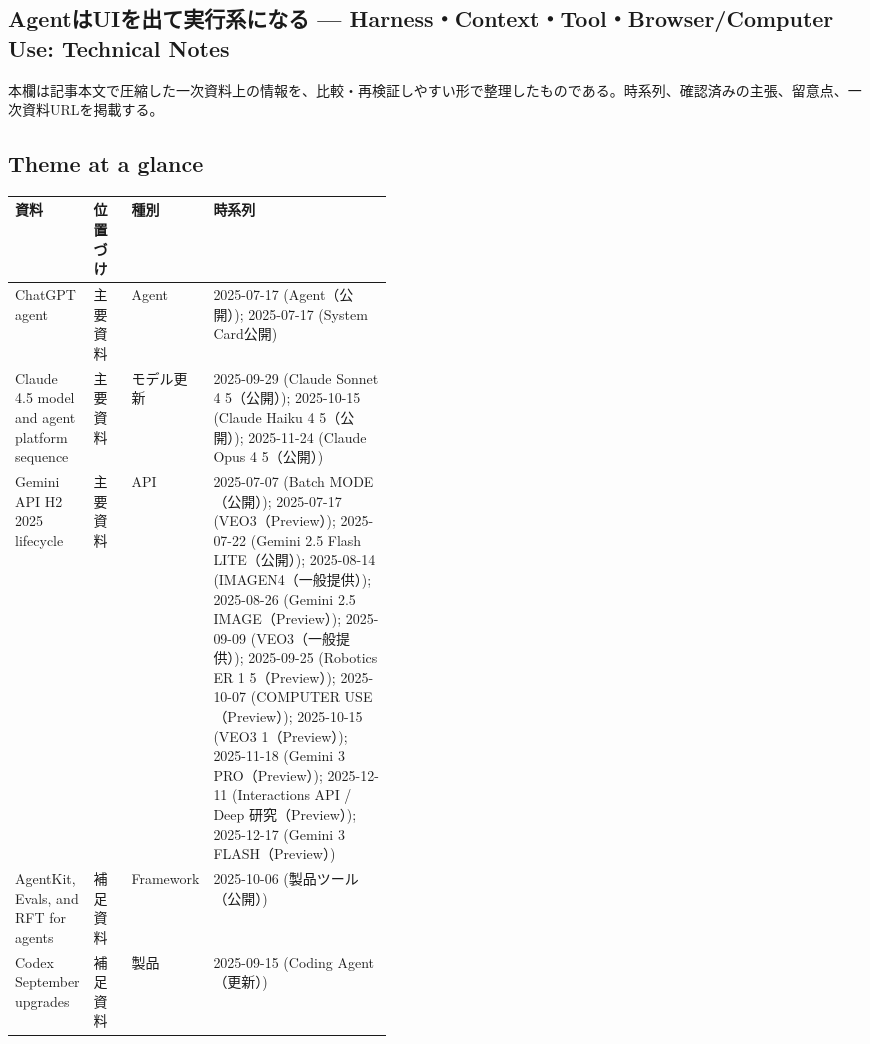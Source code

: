 \subsection*{AgentはUIを出て実行系になる — Harness・Context・Tool・Browser/Computer Use: Technical Notes}
本欄は記事本文で圧縮した一次資料上の情報を、比較・再検証しやすい形で整理したものである。時系列、確認済みの主張、留意点、一次資料URLを掲載する。
\medskip
\subsection*{Theme at a glance}
\begin{center}
\footnotesize
\begin{tabularx}{\linewidth}{@{}p{0.20\linewidth}p{0.10\linewidth}p{0.14\linewidth}X@{}}
\toprule
資料 & 位置づけ & 種別 & 時系列 \\
\midrule
ChatGPT agent & 主要資料 & Agent & 2025-07-17 (Agent（公開）); 2025-07-17 (System Card公開)    \\
Claude 4.5 model and agent platform sequence & 主要資料 & モデル更新 & 2025-09-29 (Claude Sonnet 4 5（公開）); 2025-10-15 (Claude Haiku 4 5（公開）); 2025-11-24 (Claude Opus 4 5（公開）)    \\
Gemini API H2 2025 lifecycle & 主要資料 & API & 2025-07-07 (Batch MODE（公開）); 2025-07-17 (VEO3（Preview）); 2025-07-22 (Gemini 2.5 Flash LITE（公開）); 2025-08-14 (IMAGEN4（一般提供）); 2025-08-26 (Gemini 2.5 IMAGE（Preview）); 2025-09-09 (VEO3（一般提供）); 2025-09-25 (Robotics ER 1 5（Preview）); 2025-10-07 (COMPUTER USE（Preview）); 2025-10-15 (VEO3 1（Preview）); 2025-11-18 (Gemini 3 PRO（Preview）); 2025-12-11 (Interactions API / Deep 研究（Preview）); 2025-12-17 (Gemini 3 FLASH（Preview）)    \\
AgentKit, Evals, and RFT for agents & 補足資料 & Framework & 2025-10-06 (製品ツール（公開）)    \\
Codex September upgrades & 補足資料 & 製品 & 2025-09-15 (Coding Agent（更新）)    \\
\bottomrule
\end{tabularx}
\end{center}
\normalsize

